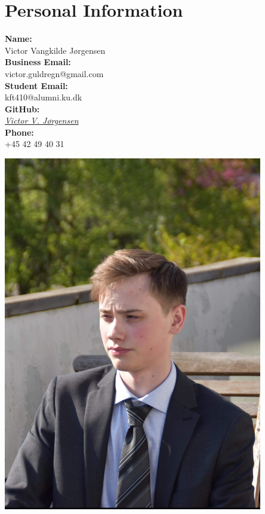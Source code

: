 \documentclass[a4paper,11.5pt]{article}
\makeatletter
\newcommand{\name}{Victor Vangkilde Jørgensen}
\newcommand{\phone}{+45 42 49 40 31}
\newcommand{\emailBusiness}{victor.guldregn@gmail.com}
\newcommand{\emailStudent}{kft410@alumni.ku.dk}
\makeatother
\begin{document}
\noindent
\begin{minipage}[t]{0.74\textwidth}
    \section*{Personal Information}
    \vspace{0pt}  %
    \textbf{Name:} \\
    \name\\
    \textbf{Business Email:}\\
    \emailBusiness\\
    \textbf{Student Email:}\\
    \emailStudent\\
    \textbf{GitHub:}\\ 
    \href{https://github.com/P1N60}{\textit{Victor V. Jørgensen}}\\
    \textbf{Phone:}\\
    \phone
\end{minipage}
\hfill
\begin{minipage}[t]{0.24\textwidth}
    \vspace{0pt}  %
    \includegraphics[width=0.85\textwidth, trim={3cm 2cm 1.5cm 4cm}, clip, cfbox=black 0.75pt 0.75pt]{profilbillede.jpg}
\end{minipage}\\
\end{document}

